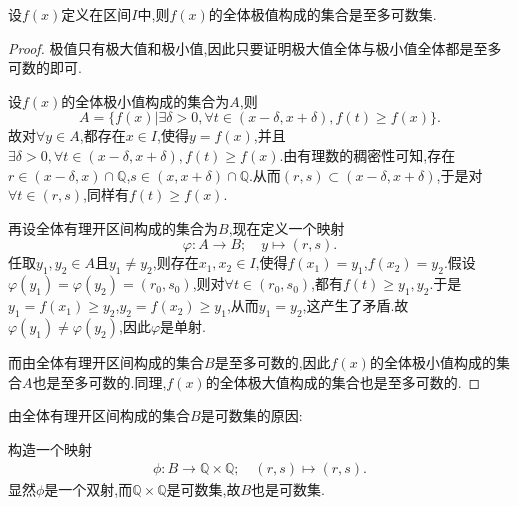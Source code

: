 \documentclass[../../main.tex]{subfiles}%
\begin{document}
\begin{lemma}\label{lemma:R中的极值点集至多可数}
设\(f(x)\)定义在区间\(I\)中,则\(f(x)\)的全体极值构成的集合是至多可数集.
\end{lemma}
\begin{proof}

极值只有极大值和极小值,因此只要证明极大值全体与极小值全体都是至多可数的即可.

设\(f(x)\)的全体极小值构成的集合为\(A\),则
\[
A = \{f(x)|\exists\delta > 0,\forall t\in(x - \delta,x + \delta),f(t)\geqslant f(x)\}.
\]
故对\(\forall y\in A\),都存在\(x\in I\),使得\(y = f(x)\),并且\(\exists\delta > 0,\forall t\in(x - \delta,x + \delta),f(t)\geqslant f(x)\).由有理数的稠密性可知,存在\(r\in(x - \delta,x)\cap\mathbb{Q}\),\(s\in(x,x + \delta)\cap\mathbb{Q}\).从而\((r,s)\subset(x - \delta,x + \delta)\),于是对\(\forall t\in(r,s)\),同样有\(f(t)\geqslant f(x)\).

再设全体有理开区间构成的集合为\(B\),现在定义一个映射
\[
\varphi:A\longrightarrow B;\quad y\longmapsto(r,s).
\]
任取\(y_1,y_2\in A\)且\(y_1\neq y_2\),则存在\(x_1,x_2\in I\),使得\(f(x_1)=y_1\),\(f(x_2)=y_2\).假设\(\varphi(y_1)=\varphi(y_2)=(r_0,s_0)\),则对\(\forall t\in(r_0,s_0)\),都有\(f(t)\geqslant y_1,y_2\).于是\(y_1 = f(x_1)\geqslant y_2\),\(y_2 = f(x_2)\geqslant y_1\),从而\(y_1 = y_2\),这产生了矛盾.故\(\varphi(y_1)\neq\varphi(y_2)\),因此\(\varphi\)是单射.

而由全体有理开区间构成的集合\(B\)是至多可数的,因此\(f(x)\)的全体极小值构成的集合\(A\)也是至多可数的.同理,\(f(x)\)的全体极大值构成的集合也是至多可数的.

\end{proof}
\begin{remark}
由全体有理开区间构成的集合\(B\)是可数集的原因:

构造一个映射
\begin{align*}
\phi :B\longrightarrow \mathbb{Q} \times \mathbb{Q} ;\quad \left( r,s \right) \longmapsto \left( r,s \right) .
\end{align*}
显然$\phi$是一个双射,而$\mathbb{Q} \times \mathbb{Q}$是可数集,故$B$也是可数集.
\end{remark}
\end{document}
